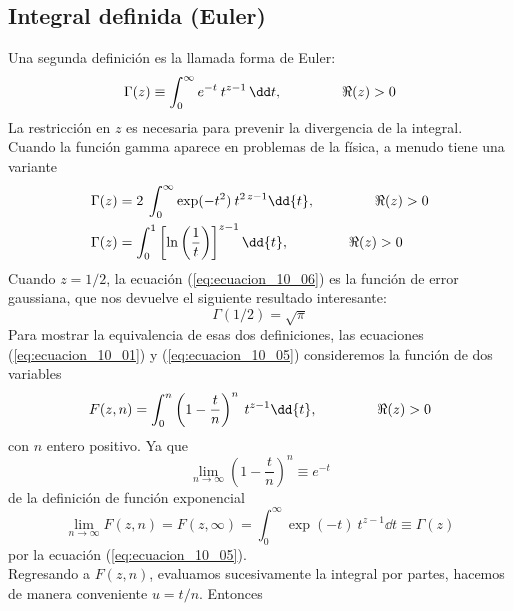 \subsection{Integral definida (Euler)}
Una segunda definición es la llamada forma de Euler:
\begin{equation}
\Gamma (z) \equiv \int_{0}^{\infty} e^{-t} \: t^{z - 1} \, \dd t, \hspace{1.5cm} \Re(z) > 0
\label{eq:ecuacion_10_05}
\end{equation}
La restricción en $z$ es necesaria para prevenir la divergencia de la integral. Cuando la función gamma aparece en problemas de la física, a menudo tiene una variante
\begin{align}
\Gamma (z) &= 2 \: \int_{0}^{\infty} \exp(-t^{2}) \: t^{2 \, z - 1} \dd{t}, \hspace{1.5cm} \Re(z) > 0  \label{eq:ecuacion_10_06} \\
\Gamma (z) &=  \int_{0}^{1} \left[ \ln\left(\dfrac{1}{t} \right) \right]^{z - 1} \dd{t}, \hspace{1.5cm} \Re (z) > 0 \label{eq:ecuacion_10_07}
\end{align}
Cuando $z=1/2$, la ecuación (\ref{eq:ecuacion_10_06}) es la función de error gaussiana, que nos devuelve el siguiente resultado interesante:
\begin{equation}
\Gamma (1/2) = \sqrt{\pi}
\label{eq:ecuacion_10_08}
\end{equation}
Para mostrar la equivalencia de esas dos definiciones, las ecuaciones (\ref{eq:ecuacion_10_01}) y (\ref{eq:ecuacion_10_05}) consideremos la función de dos variables
\begin{equation}
F(z, n) = \int_{0}^{n} \left( 1 - \dfrac{t}{n} \right)^{n} \: t^{z - 1} \dd{t}, \hspace{1.5cm} \Re(z) > 0
\label{eq:ecuacion_10_09}
\end{equation}
con $n$ entero positivo. Ya que
\begin{equation}
\lim_{n \to \infty} \left( 1 - \dfrac{t}{n} \right)^{n} \equiv e^{-t}
\label{eq:ecuacion_10_10}
\end{equation}
de la definición de función exponencial
\begin{equation}
\lim_{n \to \infty} F(z, n) = F(z, \infty) = \int_{0}^{\infty} \exp(-t) \: t^{z - 1} \dd{t} \equiv \Gamma (z)
\label{eq:ecuacion_10_11}
\end{equation}
por la ecuación (\ref{eq:ecuacion_10_05}).
\\
Regresando a $F(z,n)$, evaluamos sucesivamente la integral por partes, hacemos de manera conveniente $u = t/n$. Entonces
